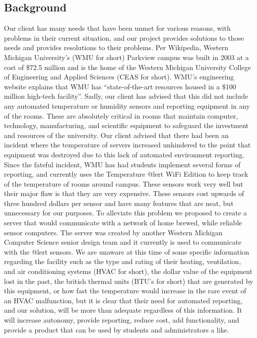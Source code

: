 \documentclass{report}
\begin{document}
\subsection*{Background}
Our client has many needs that have been unmet for various reasons, with problems in their current situation, and our project provides solutions to those needs and provides resolutions to their problems.
\newline
\indent
Per Wikipedia, Western Michigan University's (WMU for short) Parkview campus was built in 2003 at a cost of $\$$72.5 million and is the home of the Western Michigan University College of Engineering and Applied Sciences (CEAS for short).  WMU’s engineering website explains that WMU has “state-of-the-art resources housed in a $\$$100 million high-tech facility”. 
Sadly, our client has advised that this did not include any automated temperature or humidity sensors and reporting equipment in any of the rooms.  These are absolutely critical in rooms that maintain computer, technology, manufacturing, and scientific equipment to safeguard the investment and resources of the university. Our client advised that there had been an incident where the temperature of servers increased unhindered to the point that equipment was destroyed due to this lack of automated environment reporting.
Since the fateful incident, WMU has had students implement several forms of reporting, and currently uses the Temperature @lert WiFi Edition to keep track of the temperature of rooms around campus. These sensors work very well but their major flaw is that they are very expensive. These sensors cost upwards of three hundred dollars per sensor and have many features that are neat, but unnecessary for our purposes. 
To alleviate this problem we proposed to create a server that would communicate with a network of home brewed, while reliable sensor computers. The server was created by another Western Michigan Computer Science senior design team and it currently is used to communicate with the @lert sensors.
\newine
\indent  
	We are unaware at this time of some specific information regarding the facility such as the type and rating of their heating, ventilation, and air conditioning systems (HVAC for short), the dollar value of the equipment lost in the past, the british thermal units (BTU’s for short) that are generated by this equipment, or how fast the temperature would increase in the rare event of an HVAC malfunction, but it is clear that their need for automated reporting, and our solution, will be more than adequate regardless of this information.  It will increase autonomy, provide reporting, reduce cost, add functionality, and provide a product that can be used by students and administrators a like.
\end{document}
